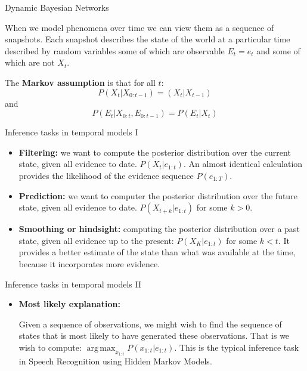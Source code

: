 \documentclass[12pt]{beamer}
\DeclareMathOperator*{\argmax}{arg\,max}
\begin{document}
\begin{frame}{Dynamic Bayesian Networks}

  When we model phenomena over time we can view them as a sequence of
  snapshots.  Each snapshot describes the state of the world at a
  particular time described by random variables some of which are
  observable $E_t = e_t$ and some of which are not $X_t$.

  The {\bf Markov assumption} is that for all $t$:
  \[
  P(X_t | X_{0:t-1}) = (X_t | X_{t-1})
  \]
  and
  \[
  P(E_t | X_{0:t}, E_{0:t-1}) = P(E_t|X_t)
  \]
\end{frame}


\begin{frame}{Inference tasks in temporal models I} 

  \begin{itemize}
    \item {\bf Filtering:} we want to compute the posterior
      distribution over the current state, given all evidence to
      date. $P(X_t | e_{1:t})$. An almost identical calculation
      provides the likelihood of the evidence sequence $P(e_{1:T})$.
    \item {\bf Prediction:} we want to computer the posterior
      distribution over the future state, given all evidence to
      date. $P(X_{t+k} | e_{1:t})$ for some $k>0$.
    \item {\bf Smoothing or hindsight:} computing the posterior distribution over a past state, given all evidence up to the present: $P(X_K | e_{1:t})$ for some $k < t$. It provides a better estimate of the state than what was available at the time, because it incorporates more evidence.


    \end{itemize} 
\end{frame}

\begin{frame}{Inference tasks in temporal models II}
\begin{itemize} 
\item{\bf Most likely explanation:}

Given a sequence of observations, we might wish to find the sequence
of states that is most likely to have generated these
observations. That is we wish to compute:
$\argmax_{x_{1:t}}P(x_{1:t}|e_{1:t})$. This is the typical inference
task in Speech Recognition using Hidden Markov Models.

\end{itemize}

\end{frame}
\end{document}
